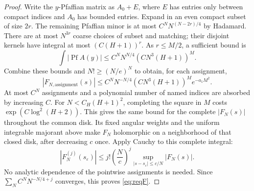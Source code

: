\documentclass[11pt]{article}
\numberwithin{equation}{section}
\theoremstyle{definition}
\newcommand{\Pf}{\operatorname{Pf}}
\newcommand{\se}{s_\varepsilon}
\begin{document}
\begin{proof}
Write the \(y\)-Pfaffian matrix as \(A_0+E\), where \(E\) has entries
only between compact indices and \(A_0\) has bounded entries.
Expand in an even compact subset of size \(2r\). The remaining
Pfaffian minor is at most \(C^N N^{(N-2r)/4}\) by Hadamard.
There are at most \(N^{3r}\) coarse choices of subset and matching;
their disjoint kernels have integral at most \((C(H+1))^r\).
As \(r\le M/2\), a sufficient bound is
\[
 \int|\Pf A(y)|\le C^N N^{N/4}(CN^3(H+1))^M.
 \]
Combine these bounds and \(N!\ge(N/e)^N\) to obtain, for each assignment,
\[
 |F_{N,\mathrm{assignment}}(s)|
 \le C^N N^{-N/4}(CN^3(H+1))^M e^{-a_1M^2}.
 \]
At most \(C^N\) assignments and a polynomial number of named indices
are absorbed by increasing \(C\). For \(N<C_H(H+1)^2\), completing
the square in \(M\) costs \(\exp(C\log^2(H+2))\).
This gives the same bound for the complete \(|F_N(s)|\) throughout
the common disk. Its fixed angular weights and the uniform integrable
majorant above make \(F_N\) holomorphic on a neighborhood of that
closed disk, after decreasing \(c\) once. Apply Cauchy to this complete
integral:
\[
 |F_N^{(j)}(\se)|\le j!\left(\frac Nc\right)^j
       \sup_{|s-\se|\le c/N}|F_N(s)|.
\]
No analytic dependence of the pointwise assignments is needed.
Since \(\sum_N C^N N^{-N/4+j}\) converges, this proves \eqref{eq:reqF}.
\end{proof}



\end{document}
